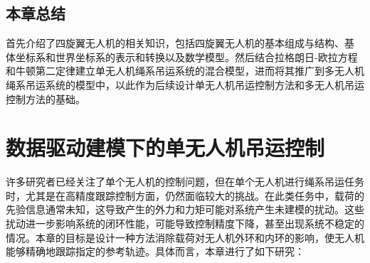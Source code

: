 \documentclass[lang=chs, degree=master, blindreview=false, winfonts=true]{yanputhesis}
\begin{document}

\section{本章总结}
首先介绍了四旋翼无人机的相关知识，包括四旋翼无人机的基本组成与结构、基
体坐标系和世界坐标系的表示和转换以及数学模型。然后结合拉格朗日-欧拉方程和牛顿第二定律建立单无人机绳系吊运系统的混合模型，进而将其推广到多无人机绳系吊运系统的模型中，以此作为后续设计单无人机吊运控制方法和多无人机吊运控制方法的基础。
\cleardoublepage

\chapter{数据驱动建模下的单无人机吊运控制}
许多研究者已经关注了单个无人机的控制问题，但在单个无人机进行绳系吊运任务时，尤其是在高精度跟踪控制方面，仍然面临较大的挑战。在此类任务中，载荷的先验信息通常未知，这导致产生的外力和力矩可能对系统产生未建模的扰动。这些扰动进一步影响系统的闭环性能，可能导致控制精度下降，甚至出现系统不稳定的情况。本章的目标是设计一种方法消除载荷对无人机外环和内环的影响，使无人机能够精确地跟踪指定的参考轨迹。具体而言，本章进行了如下研究：
\end{document}
